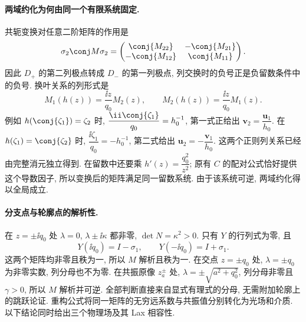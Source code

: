 \paragraph{两域约化为何由同一个有限系统固定.}
共轭变换对任意二阶矩阵的作用是
\[
\sigma_2\conj M\sigma_2
=\begin{pmatrix}
\conj{M_{22}}&-\conj{M_{21}}\\
-\conj{M_{12}}&\conj{M_{11}}
\end{pmatrix}.
\]
因此 $D_+$ 的第二列极点转成 $D_-$ 的第一列极点,
列交换时的负号正是负留数条件中的负号.
换叶关系的列形式是
\[
M_1(h(z))=\dfrac{\ii z}{q_0}M_2(z),\qquad
M_2(h(z))=\dfrac{\ii z}{q_0}M_1(z).
\]
例如 $h(\conj{\zeta_1})=\zeta_2$ 时,
$\dfrac{\ii\conj{\zeta_1}}{q_0}=h_0^{-1}$,
第一式正给出 $\mathbf v_2=\dfrac{\mathbf u_1}{h_0}$.
在 $h(\zeta_1)=\conj{\zeta_2}$ 时,
$\dfrac{\ii\zeta_1}{q_0}=-h_0^{-1}$,
第二式给出 $\mathbf u_2=-\dfrac{\mathbf v_1}{h_0}$.
这两个正则列关系已经由完整消元独立得到.
在留数中还要乘 $h'(z)=\dfrac{q_0^2}{z^2}$;
原有 $C$ 的配对公式恰好提供这个导数因子,
所以变换后的矩阵满足同一留数系统.
由于该系统可逆, 两域约化得以全局成立.

\paragraph{分支点与轮廓点的解析性.}
在 $z=\pm\ii q_0$ 处 $\lambda=0$,
$\lambda\pm\ii\kappa$ 都非零, $\det N=\kappa^2>0$.
只有 $Y$ 的行列式为零, 且
\[
Y(\ii q_0)=I-\sigma_1,\qquad
Y(-\ii q_0)=I+\sigma_1.
\]
这两个矩阵均非零且秩为一, 所以 $M$ 解析且秩为一.
在交点 $z=\pm q_0$ 处, $\lambda=\pm q_0$ 为非零实数,
列分母也不为零.
在共振原像 $z_a^\pm$ 处, $\lambda=\pm\sqrt{a^2+q_0^2}$,
列分母非零且 $\gamma>0$, 所以 $M$ 解析并可逆.
全部判断直接来自显式有理式的分母, 无需附加轮廓上的跳跃论证.
重构公式将同一矩阵的无穷远系数与共振值分别转化为光场和介质. 以下结论同时给出三个物理场及其 Lax 相容性.

